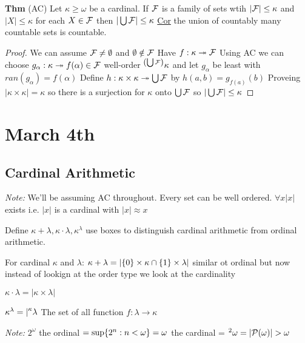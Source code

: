 \textbf{Thm} (AC) Let $\kappa \geq \omega$ be a cardinal.
If $\mathcal F$ is a family of sets wtih $|\mathcal F| \leq \kappa$ and $|X| \leq \kappa$ for each $X \in \mathcal F$ then $|\bigcup \mathcal F| \leq \kappa$
\underline{Cor} the union of countably many countable sets is countable.


\newcommand{\leftsuperscript}[2]{{\vphantom{{#1}}}^{#2}{#1}}

\begin{proof}
    We can assume $\mathcal F \neq \emptyset$ and $\emptyset \notin \mathcal F$
    Have $f : \kappa \twoheadrightarrow \mathcal F$
    Using AC we can choose $g_\alpha : \kappa \twoheadrightarrow f(\alpha) \in \mathcal F$
    well-order $\leftsuperscript{\kappa}{\left(\bigcup \FF\right)} $ and let $g_\alpha$ be least with $ran(g_\alpha)=f(\alpha)$
    Define $h: \kappa \times \kappa \twoheadrightarrow \bigcup \mathcal F$ by
    $h(a,b) = g_{f(a)}(b)$
    Proveing $|\kappa \times \kappa| = \kappa$ so there is a surjection for $\kappa$ onto $\bigcup \mathcal F$ so $|\bigcup \mathcal F| \leq \kappa$
    \end{proof}

\section{March 4th}

\subsection{Cardinal Arithmetic}
\emph{Note:} We'll be assuming AC throughout.
Every set can be well ordered.
$\forall x |x|$ exists i.e. $|x|$ is a cardinal with $|x| \approx x$

Define $\kappa + \lambda, \kappa \cdot \lambda, \kappa^\lambda$
use boxes to distinguish cardinal arithmetic from ordinal arithmetic.

\dfn For cardinal $\kappa$ and $\lambda$:
$\kappa + \lambda = | \{0\} \times \kappa \cap \{1\} \times \lambda |$
similar ot ordinal but now instead of lookign at the order type we look at the cardinality

$\kappa \cdot \lambda = |\kappa \times \lambda|$



$\kappa^\lambda = |\leftsuperscript{\lambda}{\kappa} $
The set of all function $f : \lambda \rightarrow \kappa$

\emph{Note:} $2^\omega$ the ordinal $= \sup\{2^n : n < \omega\} = \omega$
the cardinal = $\leftsuperscript{\omega}{2} = |\PP(\omega)| > \omega$

